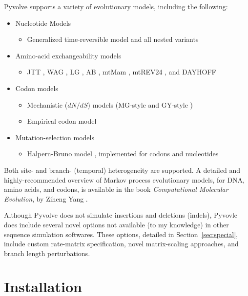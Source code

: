 \documentclass{article}
\begin{document}
\vspace*{1cm}
Pyvolve supports a variety of evolutionary models, including the following:
\begin{itemize}
	\item Nucleotide Models 
	\begin{itemize}
		\item Generalized time-reversible model \cite{GTR} and all nested variants
	\end{itemize}
	\item Amino-acid exchangeability models 
	\begin{itemize}
		\item JTT \cite{JTT}, WAG \cite{WAG}, LG \cite{LG}, AB \cite{ABmodel}, mtMam \cite{YangNielsenHasagawa1998}, mtREV24 \cite{mtrev24}, and DAYHOFF \cite{dayhoff}
	\end{itemize}
	\item Codon models
	\begin{itemize}
		\item Mechanistic ($dN/dS$) models (MG-style \cite{MG94} and GY-style \cite{GY94})
		\item Empirical codon model \cite{ECM}
	\end{itemize}
	\item Mutation-selection models
	\begin{itemize}
		\item Halpern-Bruno model \cite{HB98}, implemented for codons and nucleotides
	\end{itemize}
\end{itemize}
\renewcommand{\arraystretch}{1.75} %
\setlength{\parskip}{12pt}

Both site- and branch- (temporal) heterogeneity are supported. A detailed and highly-recommended overview of Markov process evolutionary models, for DNA, amino acids, and codons, is available in the book \emph{Computational Molecular Evolution}, by Ziheng Yang \citep{Yang2006}.

Although Pyvolve does not simulate insertions and deletions (indels), Pyvovle does include several novel options not available (to my knowledge) in other sequence simulation softwares. These options, detailed in Section~\ref{sec:special}, include custom rate-matrix specification, novel matrix-scaling approaches, and branch length perturbations.

\section{Installation}
\end{document}
